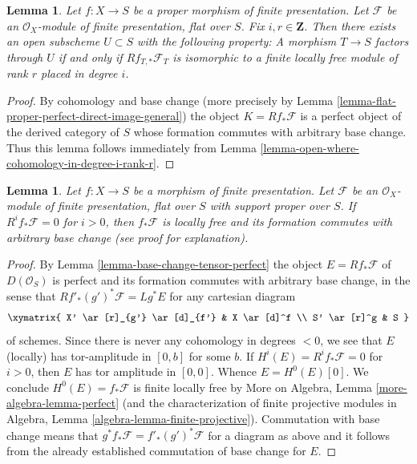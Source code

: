 \documentclass{stacks-project}
\theoremstyle{plain}
\newtheorem{lemma}[subsection]{Lemma}
\theoremstyle{definition}
\theoremstyle{remark}
\numberwithin{equation}{subsection}
\begin{document}
\begin{lemma}
\label{lemma-open-where-cohomology-in-degree-i-rank-r-geometric}
Let $f : X \to S$ be a proper morphism of finite presentation.
Let $\mathcal{F}$ be an $\mathcal{O}_X$-module of finite presentation,
flat over $S$. Fix $i, r \in \mathbf{Z}$.
Then there exists an open subscheme
$U \subset S$ with the following property:
A morphism $T \to S$ factors through $U$ if and only if
$Rf_{T, *}\mathcal{F}_T$ is isomorphic to a
finite locally free module of rank $r$ placed in degree $i$.
\end{lemma}

\begin{proof}
By cohomology and base change (more precisely by
Lemma \ref{lemma-flat-proper-perfect-direct-image-general})
the object $K = Rf_*\mathcal{F}$ is a perfect object of the derived
category of $S$ whose formation commutes with arbitrary base change.
Thus this lemma follows immediately from
Lemma \ref{lemma-open-where-cohomology-in-degree-i-rank-r}.
\end{proof}

\begin{lemma}
\label{lemma-vanishing-implies-locally-free}
Let $f : X \to S$ be a morphism of finite presentation.
Let $\mathcal{F}$ be an $\mathcal{O}_X$-module of finite presentation,
flat over $S$ with support proper over $S$. If $R^if_*\mathcal{F} = 0$
for $i > 0$, then $f_*\mathcal{F}$ is locally free and its formation
commutes with arbitrary base change (see proof for explanation).
\end{lemma}

\begin{proof}
By Lemma \ref{lemma-base-change-tensor-perfect}
the object $E = Rf_*\mathcal{F}$ of $D(\mathcal{O}_S)$
is perfect and its formation commutes with arbitrary base change,
in the sense that $Rf'_*(g')^*\mathcal{F} = Lg^*E$
for any cartesian diagram
$$
\xymatrix{
X' \ar[r]_{g'} \ar[d]_{f'} &
X \ar[d]^f \\
S' \ar[r]^g &
S
}
$$
of schemes.
Since there is never any cohomology in degrees $< 0$, we see that
$E$ (locally) has tor-amplitude in $[0, b]$ for some $b$.
If $H^i(E) = R^if_*\mathcal{F} = 0$ for $i > 0$,
then $E$ has tor amplitude in $[0, 0]$. Whence
$E = H^0(E)[0]$. We conclude $H^0(E) = f_*\mathcal{F}$
is finite locally free by
More on Algebra, Lemma \ref{more-algebra-lemma-perfect}
(and the characterization of finite projective modules
in Algebra, Lemma \ref{algebra-lemma-finite-projective}).
Commutation with base change means that
$g^*f_*\mathcal{F} = f'_*(g')^*\mathcal{F}$ for
a diagram as above and it follows from the already
established commutation of base change for $E$.
\end{proof}
\end{document}
